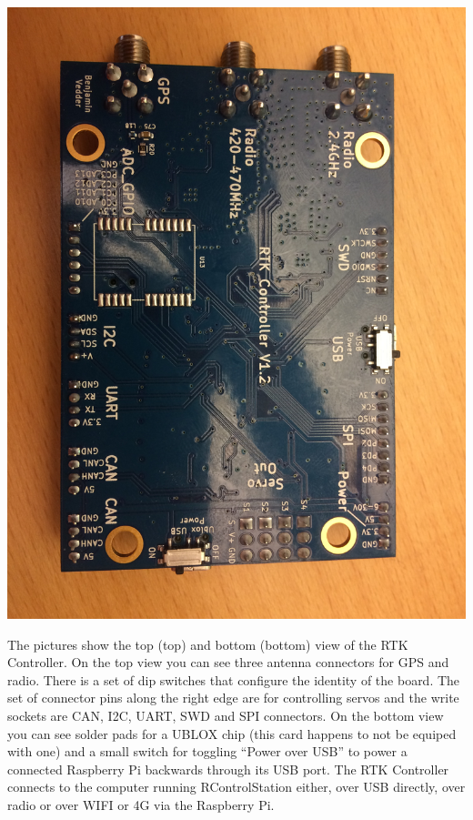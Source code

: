\documentclass[12pt]{article} %
\begin{document}
\begin{minipage}{0.33\textwidth}
  \noindent \includegraphics[width=\textwidth]{./photos/RTKControl1.JPG}
\end{minipage}
\begin{minipage}{0.66\textwidth} %
  The pictures show the top (top) and bottom (bottom) view of the RTK
  Controller. On the top view you can see three antenna connectors for
  GPS and radio.  There is a set of dip switches that configure the
  identity of the board. The set of connector pins along the right
  edge are for controlling servos and the write sockets are CAN, I2C,
  UART, SWD and SPI connectors.  On the bottom view you can see solder
  pads for a UBLOX chip (this card happens to not be equiped with one)
  and a small switch for toggling ``Power over USB'' to power a
  connected Raspberry Pi backwards through its USB port.  The RTK
  Controller connects to the computer running RControlStation either,
  over USB directly, over radio or over WIFI or 4G via the Raspberry
  Pi.
\end{minipage}
\end{document}
